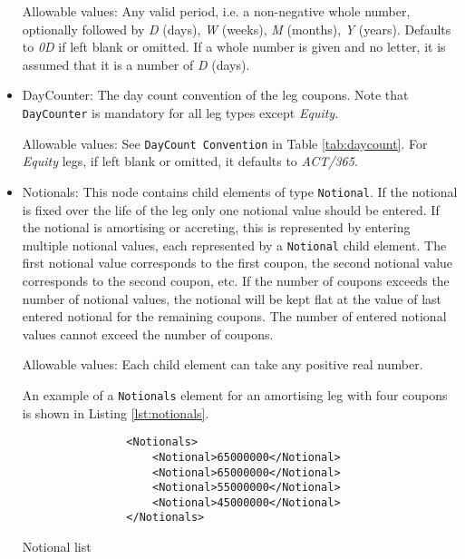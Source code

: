 \begin{itemize}
Allowable values: Any valid period, i.e. a non-negative whole number, optionally followed by \emph{D} (days), \emph{W} (weeks), \emph{M} (months),
  \emph{Y} (years). Defaults to \emph{0D} if left blank or omitted. If a whole number is given and no letter, it is assumed that it is a number of  \emph{D} (days).

\item DayCounter: The day count convention of the leg coupons. Note that \lstinline!DayCounter! is mandatory for all leg types except \emph{Equity}.

Allowable values: See \lstinline!DayCount Convention! in Table \ref{tab:daycount}. For \emph{Equity} legs, if left blank or omitted, it defaults to \emph{ACT/365}.

\item Notionals: This node contains child elements of type
  \lstinline!Notional!. If the notional is fixed over the life of the
  leg only one notional value should be entered. If the notional is
  amortising or accreting, this is represented by entering multiple
  notional values, each represented by a \lstinline!Notional! child
  element. The first notional value corresponds to the first coupon,
  the second notional value corresponds to the second coupon, etc. If
  the number of coupons exceeds the number of notional values, the
  notional will be kept flat at the value of last entered notional for
  the remaining coupons.  The number of entered notional values cannot
  exceed the number of coupons.

Allowable values: Each child element can take any positive real number.

\vspace{1em}

An example of a \lstinline!Notionals! element for an amortising leg with four coupons is shown in Listing \ref{lst:notionals}.
\begin{listing}[H]
\begin{verbatim}
                <Notionals>
                    <Notional>65000000</Notional>
                    <Notional>65000000</Notional>
                    <Notional>55000000</Notional>
                    <Notional>45000000</Notional>
                </Notionals>
\end{verbatim}
\caption{Notional list}
\label{lst:notionals}
\end{listing}


\end{itemize}
